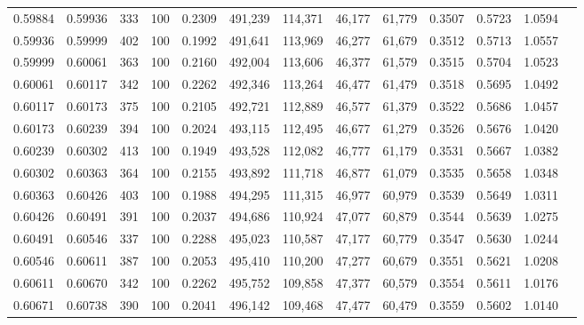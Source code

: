 \begin{tabular}{rrrrrrrrrrrrr}
0.59884 & 0.59936 &   333 & 100 &                                     0.2309 & 491,239 & 114,371 &  46,177 &  61,779 & 0.3507 & 0.5723 & 1.0594 \\
0.59936 & 0.59999 &   402 & 100 &                                     0.1992 & 491,641 & 113,969 &  46,277 &  61,679 & 0.3512 & 0.5713 & 1.0557 \\
0.59999 & 0.60061 &   363 & 100 &                                     0.2160 & 492,004 & 113,606 &  46,377 &  61,579 & 0.3515 & 0.5704 & 1.0523 \\
0.60061 & 0.60117 &   342 & 100 &                                     0.2262 & 492,346 & 113,264 &  46,477 &  61,479 & 0.3518 & 0.5695 & 1.0492 \\
0.60117 & 0.60173 &   375 & 100 &                                     0.2105 & 492,721 & 112,889 &  46,577 &  61,379 & 0.3522 & 0.5686 & 1.0457 \\
0.60173 & 0.60239 &   394 & 100 &                                     0.2024 & 493,115 & 112,495 &  46,677 &  61,279 & 0.3526 & 0.5676 & 1.0420 \\
0.60239 & 0.60302 &   413 & 100 &                                     0.1949 & 493,528 & 112,082 &  46,777 &  61,179 & 0.3531 & 0.5667 & 1.0382 \\
0.60302 & 0.60363 &   364 & 100 &                                     0.2155 & 493,892 & 111,718 &  46,877 &  61,079 & 0.3535 & 0.5658 & 1.0348 \\
0.60363 & 0.60426 &   403 & 100 &                                     0.1988 & 494,295 & 111,315 &  46,977 &  60,979 & 0.3539 & 0.5649 & 1.0311 \\
0.60426 & 0.60491 &   391 & 100 &                                     0.2037 & 494,686 & 110,924 &  47,077 &  60,879 & 0.3544 & 0.5639 & 1.0275 \\
0.60491 & 0.60546 &   337 & 100 &                                     0.2288 & 495,023 & 110,587 &  47,177 &  60,779 & 0.3547 & 0.5630 & 1.0244 \\
0.60546 & 0.60611 &   387 & 100 &                                     0.2053 & 495,410 & 110,200 &  47,277 &  60,679 & 0.3551 & 0.5621 & 1.0208 \\
0.60611 & 0.60670 &   342 & 100 &                                     0.2262 & 495,752 & 109,858 &  47,377 &  60,579 & 0.3554 & 0.5611 & 1.0176 \\
0.60671 & 0.60738 &   390 & 100 &                                     0.2041 & 496,142 & 109,468 &  47,477 &  60,479 & 0.3559 & 0.5602 & 1.0140 \\

\end{tabular}
